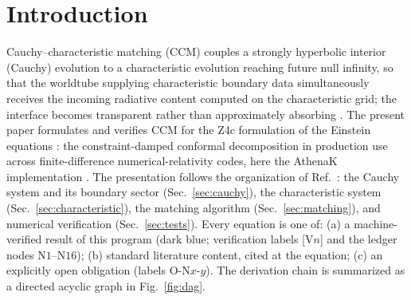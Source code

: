 \section{Introduction}
\label{sec:intro}

Cauchy--characteristic matching (CCM) couples a strongly hyperbolic
interior (Cauchy) evolution to a characteristic evolution reaching future
null infinity, so that the worldtube supplying characteristic boundary
data simultaneously receives the incoming radiative content computed on
the characteristic grid; the interface becomes transparent rather than
approximately absorbing \cite{Ma:2023qjn,Moxon:2020gha}. The present
paper formulates and verifies CCM for the Z4c formulation of the Einstein
equations \cite{Bernuzzi:2009ex,Hilditch:2012fp,Ruiz:2010qj}: the
constraint-damped conformal decomposition in production use across
finite-difference numerical-relativity codes, here the AthenaK
implementation \cite{Zhu:2024utz}. The presentation follows the
organization of Ref.~\cite{Ma:2023qjn}: the Cauchy system and its
boundary sector (Sec.~\ref{sec:cauchy}), the characteristic system
(Sec.~\ref{sec:characteristic}), the matching algorithm
(Sec.~\ref{sec:matching}), and numerical verification
(Sec.~\ref{sec:tests}). Every equation is one of: (a) a machine-verified
result of this program (dark blue; verification labels [V$n$] and the
ledger nodes N$1$--N$16$); (b) standard literature content, cited at the
equation; (c) an explicitly open obligation (labels O-N$x$-$y$). The
derivation chain is summarized as a directed acyclic graph in
Fig.~\ref{fig:dag}.
